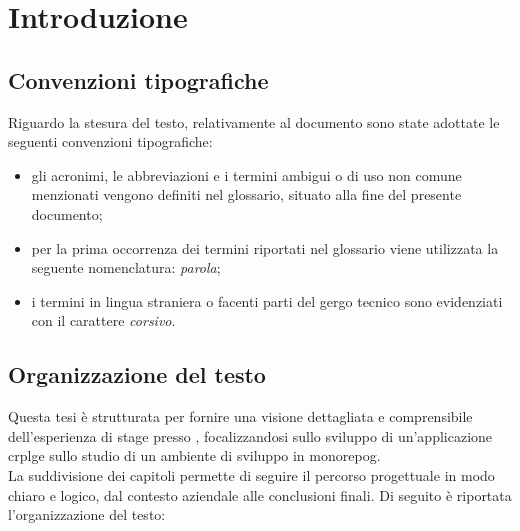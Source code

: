 \chapter{Introduzione}
\label{chap:introduzione}

\section{Convenzioni tipografiche}
Riguardo la stesura del testo, relativamente al documento sono state adottate le seguenti convenzioni tipografiche:
\begin{itemize}
	\item gli acronimi, le abbreviazioni e i termini ambigui o di uso non comune menzionati vengono definiti nel glossario, situato alla fine del presente documento;
	\item per la prima occorrenza dei termini riportati nel glossario viene utilizzata la seguente nomenclatura: \textit{parola}\glox\gloxspacing;
	\item i termini in lingua straniera o facenti parti del gergo tecnico sono evidenziati con il carattere \textit{corsivo}.
\end{itemize}


\section{Organizzazione del testo}
Questa tesi è strutturata per fornire una visione dettagliata e comprensibile dell'esperienza di stage presso \myAzienda,
focalizzandosi sullo sviluppo di un'applicazione \gls{crplg}\glox e sullo studio di un ambiente di sviluppo in \gls{monorepog}\glox.
\\La suddivisione dei capitoli permette di seguire il percorso progettuale in modo chiaro e logico, dal contesto aziendale alle conclusioni finali. 
Di seguito è riportata l'organizzazione del testo:

